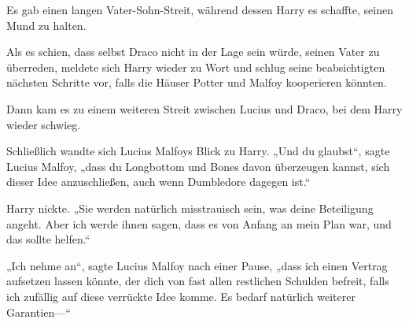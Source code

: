Es gab einen langen Vater-Sohn-Streit, während dessen Harry es schaffte, seinen Mund zu halten.

Als es schien, dass selbst Draco nicht in der Lage sein würde, seinen Vater zu überreden, meldete sich Harry wieder zu Wort und schlug seine beabsichtigten nächsten Schritte vor, falls die Häuser Potter und Malfoy kooperieren könnten.

Dann kam es zu einem weiteren Streit zwischen Lucius und Draco, bei dem Harry wieder schwieg.

Schließlich wandte sich Lucius Malfoys Blick zu Harry.
„Und du glaubst“, sagte Lucius Malfoy, „dass du Longbottom und Bones davon überzeugen kannst, sich dieser Idee anzuschließen, auch wenn Dumbledore dagegen ist.“

Harry nickte.
„Sie werden natürlich misstrauisch sein, was deine Beteiligung angeht. Aber ich werde ihnen sagen, dass es von Anfang an mein Plan war, und das sollte helfen.“

„Ich nehme an“, sagte Lucius Malfoy nach einer Pause, „dass ich einen Vertrag aufsetzen lassen könnte, der dich von fast allen restlichen Schulden befreit, falls ich zufällig auf diese verrückte Idee komme. Es bedarf natürlich weiterer Garantien—“

